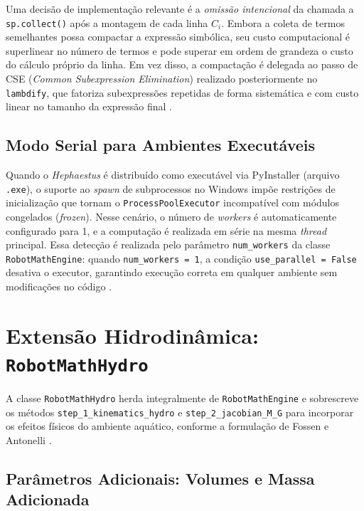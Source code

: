 Uma decisão de implementação relevante é a \emph{omissão intencional} da chamada a \texttt{sp.collect()} após a montagem de cada linha $C_i$. Embora a coleta de termos semelhantes possa compactar a expressão simbólica, seu custo computacional é superlinear no número de termos e pode superar em ordem de grandeza o custo do cálculo próprio da linha. Em vez disso, a compactação é delegada ao passo de CSE (\textit{Common Subexpression Elimination}) realizado posteriormente no \texttt{lambdify}, que fatoriza subexpressões repetidas de forma sistemática e com custo linear no tamanho da expressão final \cite{alfred2007compilers, meurer2017sympy}.

\subsection{Modo Serial para Ambientes Executáveis}

Quando o \textit{Hephaestus} é distribuído como executável via PyInstaller (arquivo \texttt{.exe}), o suporte ao \textit{spawn} de subprocessos no Windows impõe restrições de inicialização que tornam o \texttt{ProcessPoolExecutor} incompatível com módulos congelados (\textit{frozen}). Nesse cenário, o número de \textit{workers} é automaticamente configurado para 1, e a computação é realizada em série na mesma \textit{thread} principal. Essa detecção é realizada pelo parâmetro \texttt{num\_workers} da classe \texttt{RobotMathEngine}: quando \texttt{num\_workers = 1}, a condição \texttt{use\_parallel = False} desativa o executor, garantindo execução correta em qualquer ambiente sem modificações no código \cite{leu1986automated}.

\section{Extensão Hidrodinâmica: \texttt{RobotMathHydro}}
\label{sec:hydro_engine}

A classe \texttt{RobotMathHydro} herda integralmente de \texttt{RobotMathEngine} e sobrescreve os métodos \texttt{step\_1\_kinematics\_hydro} e \texttt{step\_2\_jacobian\_M\_G} para incorporar os efeitos físicos do ambiente aquático, conforme a formulação de Fossen \cite{fossen2011handbook} e Antonelli \cite{antonelli2014modelling}.

\subsection{Parâmetros Adicionais: Volumes e Massa Adicionada}


